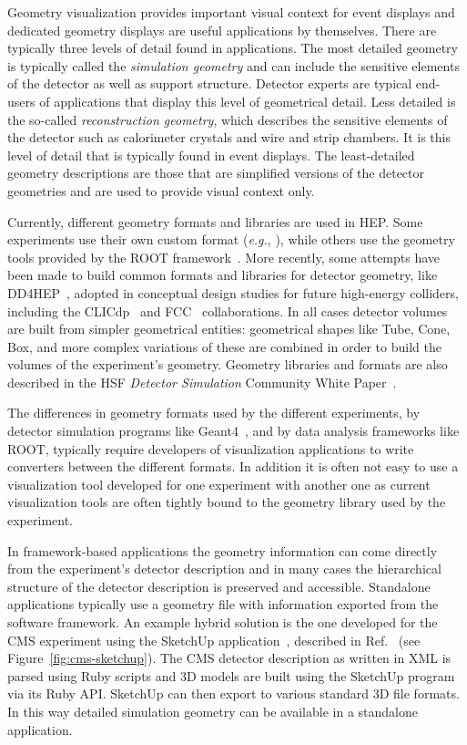 \documentclass[12pt,a4paper]{article}
\begin{document}
Geometry visualization provides important visual context for event displays and dedicated geometry displays are useful
applications by themselves. There are typically three levels of detail found in applications. The most detailed geometry
is typically called the \textit{simulation geometry} and can include the sensitive elements of the detector as well
as support structure. Detector experts are typical end-users of applications that display this level of geometrical detail. Less
detailed is the so-called \textit{reconstruction geometry}, which describes the sensitive elements of the detector
such as calorimeter crystals and wire and strip chambers. It is this level of detail that is typically found in
event displays. The least-detailed geometry descriptions are those that are simplified versions of the
detector geometries and are used to provide visual context only.

Currently, different geometry formats and libraries are used in HEP. 
Some experiments use their own custom format (\textit{e.g.}, \cite{ATLASGeoModel2004}), while others use the geometry tools provided by the ROOT framework~\cite{Root1997}.
More recently, some attempts have been made to build common formats and libraries for detector geometry, like DD4HEP~\cite{dd4hep},
adopted in conceptual design studies for future high-energy colliders, including the CLICdp~\cite{clicdp} and FCC~\cite{fcc} collaborations.
In all cases detector volumes are built from simpler geometrical entities: geometrical shapes like Tube, Cone, Box, and
more complex variations of these are combined in order to build the volumes of the experiment’s geometry.
Geometry libraries and formats are also described in the HSF \textit{Detector Simulation} Community White Paper~\cite{HSF-CWP-2017-07}.

The differences in geometry formats used by the different experiments, by detector simulation programs like Geant4~\cite{Geant4},
and by data analysis frameworks like ROOT, typically require developers of visualization applications to write converters
between the different formats. In addition it is often not easy to use a visualization tool developed for one experiment with another one as
current visualization tools are often tightly bound to the geometry library used by the experiment.

In framework-based applications the geometry information can come directly from the experiment's detector description and in
 many cases the hierarchical structure of the detector description is preserved and accessible. Standalone applications
typically use a geometry file with information exported from the software framework. An example hybrid solution is the one developed for the CMS experiment using the  
SketchUp application~\cite{sketchupSW}, described in Ref.~\cite{CMSSketchUp} (see Figure~\ref{fig:cms-sketchup}).
The CMS detector description \cite{cmsDetectorDescription} as written in XML is parsed using Ruby scripts and 3D models are built using the
SketchUp program via its Ruby API. SketchUp can then export to various standard 3D file formats. In this way
detailed simulation geometry can be available in a standalone application.
\end{document}
